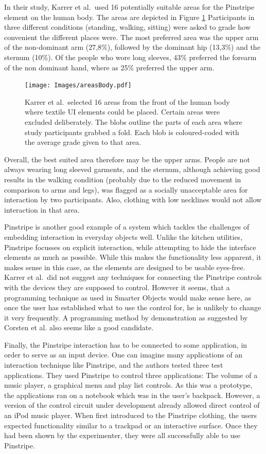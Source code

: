 In their study, Karrer et al.\ used 16 potentially suitable areas for the Pinstripe element on the human body. The areas are depicted in Figure \ref{fig:areasBody} 
Participants in three different conditions (standing, walking, sitting) were asked to grade how convenient the different places were.
The most preferred area was the upper arm of the non-dominant arm (27,8\%), followed by the dominant hip (13,3\%) and the sternum (10\%).
Of the people who wore long sleeves, 43\% preferred the forearm of the non dominant hand, where as 25\% preferred the upper arm.

\begin{figure}[!t]
	\centering
	\texttt{[image: Images/areasBody.pdf]}
	\caption{Karrer et al.\ selected 16 areas from the front of the human body where textile UI elements could be placed. Certain areas were excluded deliberately. The blobs outline the parts of each area where study participants grabbed a fold. Each blob is coloured-coded with the average grade given to that area. \cite{karrer11}}
	\label{fig:areasBody}
\end{figure}

Overall, the best suited area therefore may be the upper arms.
People are not always wearing long sleeved garments, and the sternum, although achieving good results in the walking condition (probably due to the reduced movement in comparison to arms and legs), was flagged as a socially unacceptable area for interaction by two participants.
Also, clothing with low necklines  would not allow interaction in that area.

Pinstripe is another good example of a system which tackles the challenges of embedding interaction in everyday objects well.
Unlike the kitchen utilities, Pinstripe focusses on explicit interaction, while attempting to hide the interface elements as much as possible.
While this makes the functionality less apparent, it makes sense in this case, as the elements are designed to be usable eyes-free.
Karrer et al.\ did not suggest any techniques for connecting the Pinstripe controls with the devices they are supposed to control.
However it seems, that a programming technique as used in Smarter Objects \cite{heun13smarter} would make sense here, as once the user has established what to use the control for, he is unlikely to change it very frequently.
A programming method by demonstration \cite{corsten13} as suggested by Corsten et al. also seems like a good candidate.

Finally, the Pinstripe interaction has to be connected to some application, in order to serve as an input device.
One can imagine many applications of an interaction technique like Pinstripe, and the authors tested three test applications.
They used Pinstripe to control three applications: The volume of a music player, a graphical menu and play list controls. 
As this was a prototype, the applications ran on a notebook which was in the user's backpack.
However, a version of the control circuit under development already allowed direct control of an iPod music player.
When first introduced to the Pinstripe clothing, the users expected functionality similar to a trackpad or an interactive surface. Once they had been shown by the experimenter, they were all successfully able to use Pinstripe.

